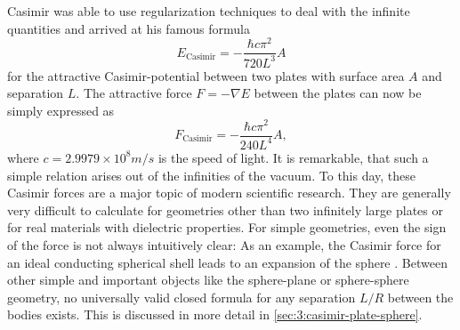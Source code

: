 Casimir was able to use regularization techniques to deal with the infinite quantities and arrived at his famous formula \cite{Casimir_1948}
\begin{equation}\label{eq:3:casimir-energy-pp-conducting}
  E_\mathrm{Casimir} = -\frac{\hbar c \pi^2}{720 L^3} A
\end{equation}
for the attractive Casimir-potential between two plates with surface area $A$ and separation $L$.
The attractive force $F=-\nabla E$ between the plates can now be simply expressed as
\begin{equation}\label{eq:3:casimir-force-pp-conducting}
  F_\mathrm{Casimir} = - \frac{\hbar c \pi^2}{240 L^4} A ,
\end{equation}
where $c=2.9979\times 10^{8}\si{m/s}$ is the speed of light.
It is remarkable, that such a simple relation arises out of the infinities of the vacuum.
To this day, these Casimir forces are a major topic of modern scientific research. They are generally very difficult to calculate for geometries other than two infinitely large plates or for real materials with dielectric properties. 
For simple geometries, even the sign of the force is not always intuitively clear: As an example, the Casimir force for an ideal conducting spherical shell leads to an expansion of the sphere \cite{Boyer_1968,Klimchitskaya_2009}.
Between other simple and important objects like the sphere-plane or sphere-sphere geometry, no universally valid closed formula for any separation $L/R$ between the bodies exists. This is discussed in more detail in \cref{sec:3:casimir-plate-sphere}.


